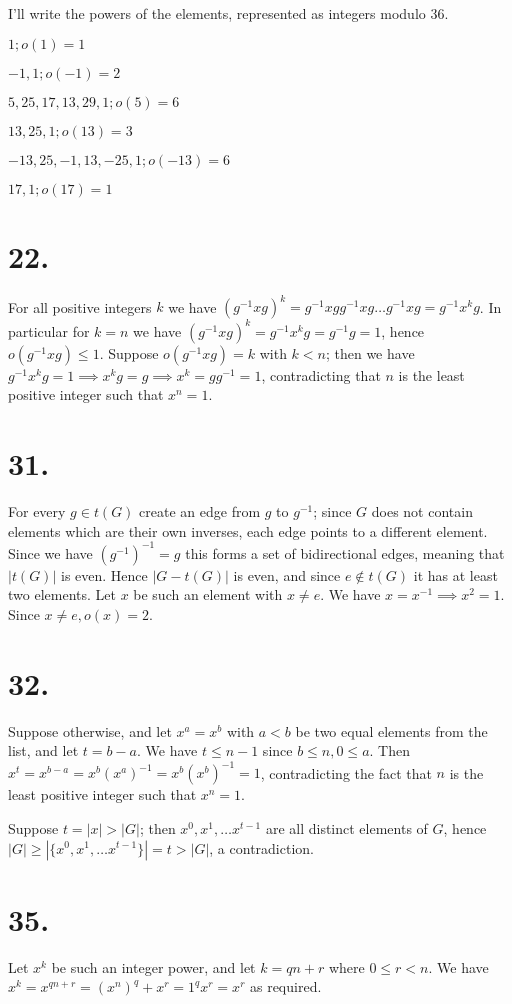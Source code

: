 \documentclass{article}
\begin{document}
I'll write the powers of the elements, represented as integers modulo $36$.

$1; o(1)=1$ 

$-1, 1; o(-1) = 2$

$5, 25, 17, 13, 29, 1; o(5) = 6$

$13, 25, 1; o(13) = 3$

$-13, 25, -1, 13, -25, 1; o(-13) = 6$

$17, 1; o(17) = 1$

\section*{22.}

For all positive integers $k$ we have $(g^{-1}xg)^k = g^{-1}xg g^{-1}xg \ldots g^{-1}xg = g^{-1}x^kg$. In particular for $k=n$ we have $(g^{-1}xg)^k = g^{-1}x^kg = g^{-1}g = 1$, hence $o(g^{-1}xg) \le 1$. Suppose $o(g^{-1}xg) = k$ with $k < n$; then we have $g^{-1}x^kg = 1 \implies x^k g = g \implies x^k = g g^{-1} = 1$, contradicting that $n$ is the least positive integer such that $x^n = 1$.

\section*{31.}

For every $g \in t(G)$ create an edge from $g$ to $g^{-1}$; since $G$ does not contain elements which are their own inverses, each edge points to a different element. Since we have $(g^{-1})^{-1} = g$ this forms a set of bidirectional edges, meaning that $|t(G)|$ is even. Hence $|G - t(G)|$ is even, and since $e \not\in t(G)$ it has at least two elements. Let $x$ be such an element with $x \ne e$. We have $x = x^{-1} \implies x^2 = 1$. Since $x \ne e, o(x) = 2$.

\section*{32.}

Suppose otherwise, and let $x^a = x^b$ with $a < b$ be two equal elements from the list, and let $t = b-a$. We have $t \le n-1$ since $b \le n, 0 \le a$. Then $x^t = x^{b-a} = x^b (x^a)^{-1} = x^b (x^b)^{-1} = 1$, contradicting the fact that $n$ is the least positive integer such that $x^n = 1$.

Suppose $t = |x| > |G|$; then $x^0, x^1, \ldots x^{t-1}$ are all distinct elements of $G$, hence $|G| \ge |\{x^0, x^1, \ldots x^{t-1}\}| = t > |G|$, a contradiction.

\section*{35.}

Let $x^k$ be such an integer power, and let $k = qn + r$ where $0 \le r < n$. We have $x^k = x^{qn+r} = (x^n)^q + x^r = 1^q x^r = x^r$ as required.
\end{document}
